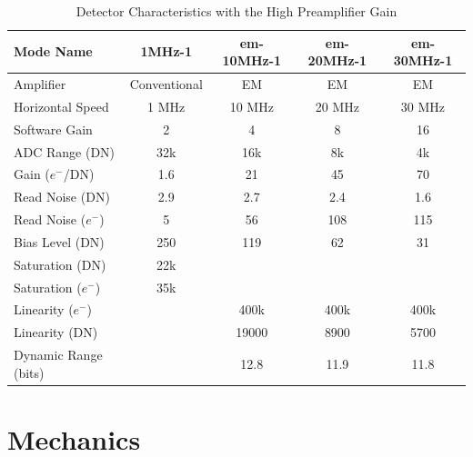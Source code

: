 \begin{table}
    \centering
    \begin{tabular}{lcccc}
    \hline
    Mode Name&1MHz-1&em-10MHz-1&em-20MHz-1&em-30MHz-1\\
    \hline
    Amplifier&Conventional&EM&EM&EM\\
    Horizontal Speed&1 MHz&10 MHz&20 MHz&30 MHz\\
    Software Gain&2&4&8&16\\
    ADC Range (DN)&32k&16k&8k&4k\\
    Gain ($e^-$/DN)&1.6&21&45&70\phantom{0}\\
    Read Noise (DN)&2.9&2.7&2.4&1.6\\
    Read Noise ($e^-$)&5&56&108&115\\
    Bias Level (DN)&250&119&62&31\\
    Saturation (DN)&22k&\\
    Saturation ($e^-$)&35k&\\
    Linearity ($e^-$)&&400k&400k&400k\\
    Linearity (DN)&&19000&8900&5700\\
    Dynamic Range (bits)&&12.8&11.9&11.8\\
    \hline
    \end{tabular}
    \caption{Detector Characteristics with the High Preamplifier Gain}
    \label{table:detector-characteristics-high-gain}
\end{table}

\section{Mechanics}

